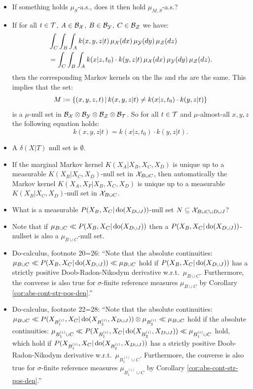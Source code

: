 \begin{Con}
 \begin{itemize}
   \item If something holds $\mu_S$-a.s., does it then hold $\mu_{M,S}$-a.s.?
   \item If for all $t \in \mathcal{T}$, $A \in \mathcal{B}_{\mathcal{X}}$, $B \in \mathcal{B}_{\mathcal{Y}}$, $C \in \mathcal{B}_{\mathcal{Z}}$ we have:
        \begin{align*} 
          &  \int_C \int_B \int_A k(x,y,z|t) \, \mu_{\mathcal{X}}(dx)\, \mu_{\mathcal{Y}}(dy)\, \mu_{\mathcal{Z}}(dz) \\
          &= \int_C \int_B \int_A k(x|z,t_0) \cdot k(y,z|t) \,\mu_{\mathcal{X}}(dx) \, \mu_{\mathcal{Y}}(dy)\, \mu_{\mathcal{Z}}(dz).
        \end{align*}
    then the corresponding Markov kernels on the lhs and rhs are the same.
    This implies that the set:
    \[ M:= \left \{ (x,y,z,t) \,\middle|\, k(x,y,z|t) \neq k(x|z,t_0) \cdot k(y,z|t) \right \} \]
    is a $\mu$-null set in $\mathcal{B}_{\mathcal{X}}\otimes\mathcal{B}_{\mathcal{Y}}\otimes\mathcal{B}_{\mathcal{Z}}\otimes\mathcal{B}_{\mathcal{T}}$.
    So for all $t \in \mathcal{T}$ and $\mu$-almost-all $x,y,z$ the following equation holds:
    \[k(x,y,z|t) = k(x|z,t_0) \cdot k(y,z|t). \]
  \item A $\delta(X|T)$ null set is $\emptyset$.
  \item If the marginal Markov kernel $K(X_A|X_B,X_C,X_D)$ is unique up to a measurable $K(X_B|X_C,X_D)$-null set in $\mathcal{X}_{B\cup C}$,
  then automatically the Markov kernel $K(X_A,X_F|X_B,X_C,X_D)$ is unique up to a measurable $K(X_B|X_C,X_D)$-null set in $\mathcal{X}_{B\cup C}$.
  \item What is a measurable $P(X_B, X_C | \operatorname{do}(X_{D\cup J}))$-null set $N \subseteq \mathcal{X}_{B\cup C\cup D \cup J}$?
  \item Note that if $\mu_{B \cup C} \ll P(X_B,X_C|\operatorname{do}(X_{D\cup J}))$ then a $P(X_B,X_C|\operatorname{do}(X_{D\cup J}))$-nullset is also a $\mu_{B \cup C}$-null set.
  \item Do-calculus, footnote 20=26: ``Note that the absolute continuities: $\mu_{B \cup C}\ll P(X_B,X_C|\operatorname{do}(X_{D\cup J})) \ll \mu_{B \cup C}$ hold if $P(X_B,X_C|\operatorname{do}(X_{D\cup J}))$ has a strictly positive Doob-Radon-Nikodym derivative w.r.t.\ $\mu_{B \cup C}$. Furthermore, the converse is also true for $\sigma$-finite reference measures $\mu_{B \cup C}$ by Corollary \ref{cor:abs-cont-str-pos-den}.''
  \item Do-calculus, footnote 22=28: ``Note that the absolute continuities: $ \mu_{B \cup C} \ll P(X_{B_1^{(i)}},X_C|\operatorname{do}(X_{B_2^{(i)}},X_{D\cup J})) \otimes \mu_{B_2^{(i)}} \ll \mu_{B \cup C} $ hold if the absolute continuities: $\mu_{B_1^{(i)} \cup C} \ll P(X_{B_1^{(i)}},X_C|\operatorname{do}(X_{B_2^{(i)}},X_{D\cup J})) \ll \mu_{B_1^{(i)} \cup C} $ hold, which hold if $P(X_{B_1^{(i)}},X_C|\operatorname{do}(X_{B_2^{(i)}},X_{D\cup J}))$ has a strictly positive Doob-Radon-Nikodym derivative w.r.t.\ $\mu_{B_1^{(i)} \cup C}$. Furthermore, the converse is also true for $\sigma$-finite reference measures $\mu_{B_1^{(i)} \cup C}$ by Corollary \ref{cor:abs-cont-str-pos-den}.''

\end{itemize}
\end{Con}
